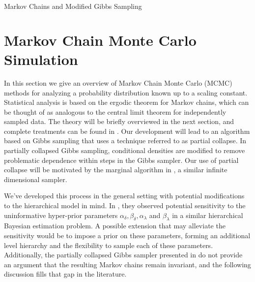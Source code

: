 \begin{chapter}{Markov Chains and Modified Gibbs Sampling}
\section{Markov Chain Monte Carlo Simulation} \label{sec:mcmcTheory}
In this section we give an overview of Markov Chain Monte Carlo (MCMC) methods for analyzing a probability distribution known up to a scaling constant.
Statistical analysis is based on the ergodic theorem for Markov chains, which can be thought of as analogous to the central limit theorem for independently sampled data. 
The theory will be briefly overviewed in the next section, and complete treatments can be found in \citep{robert2013monte}.
Our development will lead to an algorithm based on Gibbs sampling that uses a technique referred to as partial collapse.  
In partially collapsed Gibbs sampling, conditional densities are modified to remove problematic dependence within steps in the Gibbs sampler.
Our use of partial collapse will be motivated by the marginal algorithm in \citep{agapiou2014analysis}, a similar infinite dimensional sampler.

We've developed this process in the general setting with potential modifications to the hierarchical model in mind.
In \citep{howard2016bayesian}, they observed potential sensitivity to the uninformative hyper-prior parameters $\alpha_\delta,\beta_\delta,\alpha_\lambda$ and $\beta_\lambda$ in a similar hierarchical Bayesian estimation problem.
A possible extension that may alleviate the sensitivity would be to impose a prior on these parameters, forming an additional level hierarchy and the flexibility to sample each of these parameters.
Additionally, the partially collapsed Gibbs sampler presented in \citep{van2015metropolis,van2008partially} do not provide an argument that the resulting Markov chains remain invariant, and the following discussion fills that gap in the literature.


\end{chapter}
